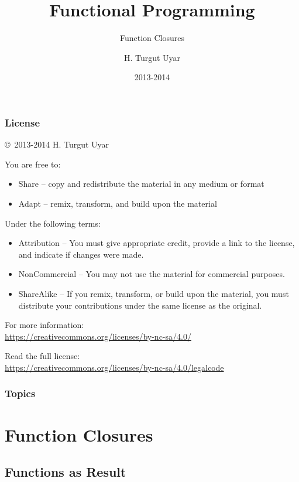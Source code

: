 \documentclass[dvipsnames]{beamer}
\title{Functional Programming}
\subtitle{Function Closures}
\author{H. Turgut Uyar}
\date{2013-2014}
\theoremstyle{plain}
\begin{document}
\begin{frame}
  \titlepage
\end{frame}

\begin{frame}
  \frametitle{License}

  \hfill
  \copyright~2013-2014 H. Turgut Uyar

  \vfill
  \begin{footnotesize}
    You are free to:
    \begin{itemize}
      \itemsep0em
      \item Share -- copy and redistribute the material in any medium or format
      \item Adapt -- remix, transform, and build upon the material
    \end{itemize}

    Under the following terms:
    \begin{itemize}
      \itemsep0em
      \item Attribution -- You must give appropriate credit, provide a link to
        the license, and indicate if changes were made.

      \item NonCommercial -- You may not use the material for commercial
        purposes.

      \item ShareAlike -- If you remix, transform, or build upon the material,
        you must distribute your contributions under the same license as the
        original.
    \end{itemize}

    For more information:\\
    \url{https://creativecommons.org/licenses/by-nc-sa/4.0/}

    \smallskip
    Read the full license:\\
    \url{https://creativecommons.org/licenses/by-nc-sa/4.0/legalcode}
  \end{footnotesize}
\end{frame}

\begin{frame}
  \frametitle{Topics}
  \tableofcontents
\end{frame}

\section{Function Closures}

\subsection{Functions as Result}
\end{document}
